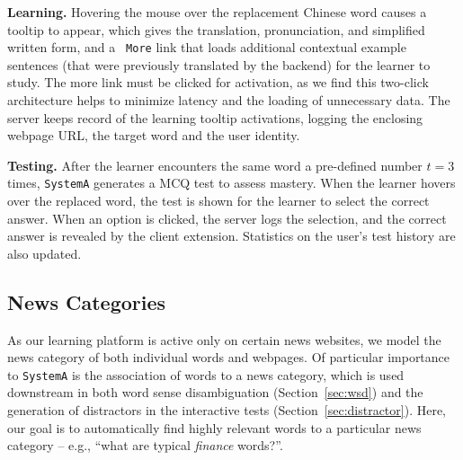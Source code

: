 \begin{CJK}{UTF8}{gbsn}
{\bf Learning.} Hovering the mouse over the replacement Chinese word
causes a tooltip to appear, which gives the translation,
pronunciation, and simplified written form, and a {\tt
  More} link that loads additional contextual example sentences (that
were previously translated by the backend) for the learner to study.
The more link must be clicked for activation, as we find this
two-click architecture helps to minimize latency and the loading of
unnecessary data.  The server keeps record of the learning tooltip
activations, logging the enclosing webpage URL, the target word and
the user identity.


{\bf Testing.}  After the learner encounters the same word a
pre-defined number $t=3$ times, {\tt SystemA} generates a MCQ test
to assess mastery.  When the learner hovers over the replaced word,
the test is shown for the learner to select the correct answer. When
an option is clicked, the server logs the selection, and the correct
answer is revealed by the client extension.  Statistics on the user's
test history are also updated.

\subsection{News Categories}
\label{subsec:category}
As our learning platform is active only on certain news websites, we
model the news category of both individual words and webpages. Of
particular importance to {\tt SystemA} is the association of words to a
news category, which is used downstream in both word sense
disambiguation (Section~\ref{sec:wsd}) and the generation of
distractors in the interactive tests (Section~\ref{sec:distractor}).
Here, our goal is to automatically find highly relevant words to a
particular news category -- e.g., ``what are typical {\it finance}
words?''.  


\end{CJK}
